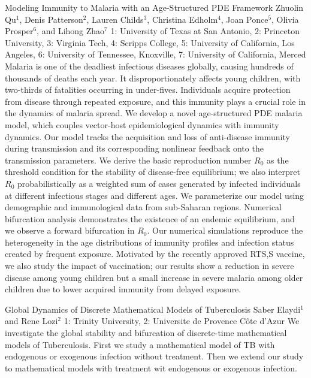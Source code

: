 \begin{addmargin}[2em]{0em}
\vspace{1.5ex}
\abs
{Modeling Immunity to Malaria with an Age-Structured PDE Framework}
{Zhuolin Qu$^{1}$, Denis Patterson$^{2}$, Lauren Childs$^{3}$, Christina Edholm$^{4}$, Joan Ponce$^{5}$, Olivia Prosper$^{6}$, and Lihong Zhao$^{7}$}
{1: University of Texas at San Antonio, 2: Princeton University, 3: Virginia Tech, 4: Scripps College, 5: University of California, Los Angeles, 6: University of Tennessee, Knoxville, 7: University of California, Merced}
{Malaria is one of the deadliest infectious diseases globally, causing hundreds of thousands of deaths each year. It disproportionately affects young children, with two-thirds of fatalities occurring in under-fives. Individuals acquire protection from disease through repeated exposure, and this immunity plays a crucial role in the dynamics of malaria spread. We develop a novel age-structured PDE malaria model, which couples vector-host epidemiological dynamics with immunity dynamics. Our model tracks the acquisition and loss of anti-disease immunity during transmission and its corresponding nonlinear feedback onto the transmission parameters. We derive the basic reproduction number $R_0$ as the threshold condition for the stability of disease-free equilibrium; we also interpret $R_0$ probabilistically as a weighted sum of cases generated by infected individuals at different infectious stages and different ages. We parameterize our model using demographic and immunological data from sub-Saharan regions. Numerical bifurcation analysis demonstrates the existence of an endemic equilibrium, and we observe a forward bifurcation in $R_0$. Our numerical simulations reproduce the heterogeneity in the age distributions of immunity profiles and infection status created by frequent exposure. Motivated by the recently approved RTS,S vaccine, we also study the impact of vaccination; our results show a reduction in severe disease among young children but a small increase in severe malaria among older children due to lower acquired immunity from delayed exposure.}


\vspace{1.5ex}
\abs
{Global Dynamics of Discrete Mathematical Models of Tuberculosis}
{Saber Elaydi$^{1}$ and Rene Lozi$^{2}$}
{1: Trinity University, 2:  Universite de Provence Côte d'Azur}
{We investigate the global stability and bifurcation of discrete-time mathematical models of Tuberculosis. First we study a mathematical model of TB with endogenous or exogenous infection without treatment. Then we extend our study to mathematical models with treatment wit endogenous or exogenous infection.}



\end{addmargin}
